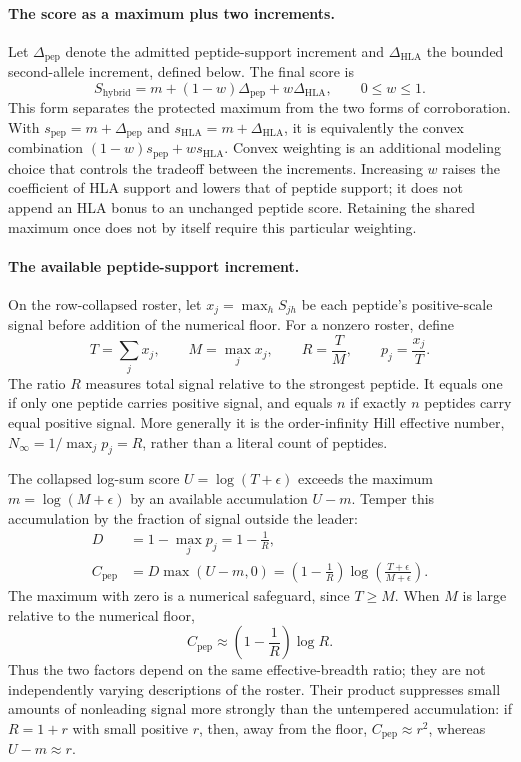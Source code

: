 \documentclass[11pt]{article}
\begin{document}
\paragraph{The score as a maximum plus two increments.}
Let \(\Delta_{\mathrm{pep}}\) denote the admitted peptide-support increment
and \(\Delta_{\mathrm{HLA}}\) the bounded second-allele increment, defined
below. The final score is
\begin{equation}
S_{\mathrm{hybrid}}
=m+(1-w)\Delta_{\mathrm{pep}}+w\Delta_{\mathrm{HLA}},
\qquad 0\leq w\leq1.
\label{eq:l2_hybrid}
\end{equation}
This form separates the protected maximum from the two forms of
corroboration. With \(s_{\mathrm{pep}}=m+\Delta_{\mathrm{pep}}\) and
\(s_{\mathrm{HLA}}=m+\Delta_{\mathrm{HLA}}\), it is equivalently the convex
combination \((1-w)s_{\mathrm{pep}}+w s_{\mathrm{HLA}}\).
Convex weighting is an additional modeling choice that controls the tradeoff
between the increments. Increasing \(w\) raises the coefficient of HLA
support and lowers that of peptide support; it does not append an HLA bonus
to an unchanged peptide score. Retaining the shared maximum once does not by
itself require this particular weighting.

\paragraph{The available peptide-support increment.}
On the row-collapsed roster, let \(x_j=\max_h S_{jh}\) be each peptide's
positive-scale signal before addition of the numerical floor. For a nonzero
roster, define
\[
T=\sum_j x_j,\qquad M=\max_j x_j,\qquad
R=\frac{T}{M},\qquad p_j=\frac{x_j}{T}.
\]
The ratio \(R\) measures total signal relative to the strongest peptide.
It equals one if only one peptide carries positive signal, and equals \(n\)
if exactly \(n\) peptides carry equal positive signal. More generally it is
the order-infinity Hill effective number,
\(N_\infty=1/\max_j p_j=R\), rather than a literal count of peptides.

The collapsed log-sum score \(U=\log(T+\epsilon)\) exceeds the maximum
\(m=\log(M+\epsilon)\) by an available accumulation \(U-m\).
Temper this accumulation by the fraction of signal outside the leader:
\begin{align*}
D&=1-\max_j p_j=1-\frac1R,\\
C_{\mathrm{pep}}&=D\max(U-m,0)
=\left(1-\frac1R\right)
\log\!\left(\frac{T+\epsilon}{M+\epsilon}\right).
\end{align*}
The maximum with zero is a numerical safeguard, since \(T\geq M\).
When \(M\) is large relative to the numerical floor,
\[
C_{\mathrm{pep}}\approx\left(1-\frac1R\right)\log R.
\]
Thus the two factors depend on the same effective-breadth ratio; they are
not independently varying descriptions of the roster. Their product
suppresses small amounts of nonleading signal more strongly than the
untempered accumulation: if \(R=1+r\) with small positive \(r\), then,
away from the floor, \(C_{\mathrm{pep}}\approx r^2\), whereas
\(U-m\approx r\).
\end{document}
